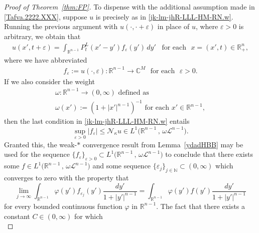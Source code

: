 \documentclass[11pt,reqno]{amsart}
\numberwithin{equation}{section}
\theoremstyle{remark}
\begin{document}
\begin{proof}[Proof of Theorem~\ref{thm:FP}]
To dispense with the additional assumption made in \eqref{Tafva.2222.XXX}, suppose $u$ is precisely as in \eqref{jk-lm-jhR-LLL-HM-RN.w}. 
Running the previous argument with $u(\cdot,\cdot+\varepsilon)$ in place of $u$, where $\varepsilon>0$ is arbitrary, 
we obtain that 
%
\begin{align}\label{AA-lm-jLL-HM-RN.ppp.wsa}
u(x',t+\varepsilon)=\int_{{\mathbb{R}}^{n-1}}P^L_t(x'-y')f_\varepsilon(y')\,dy'
\,\,\,\text{ for each }\,\,x=(x',t)\in{\mathbb{R}}^n_{+},
\end{align}
%
where we have abbreviated
%
\begin{align}\label{AA-lm-jLL-HM-RN.ppp.wsa.f}
f_\varepsilon:=u(\cdot,\varepsilon):{\mathbb{R}}^{n-1}\longrightarrow{\mathbb{C}}^M
\,\,\text{ for each }\,\,\varepsilon>0.
\end{align}
%
If we also consider the weight 
%
\begin{equation}\label{eq:16t44.iii.D+M}
\begin{array}{c}
\text{$\omega:{\mathbb{R}}^{n-1}\to(0,\infty)$ defined as} 
\\[4pt]
\text{$\omega(x'):=(1+|x'|^{n-1})^{-1}$ for each $x'\in{\mathbb{R}}^{n-1}$}, 
\end{array}
\end{equation}
%
then the last condition in \eqref{jk-lm-jhR-LLL-HM-RN.w} entails  
%
\begin{equation}\label{eq:16t44.iii}
\sup_{\varepsilon>0}|f_\varepsilon|\leq{\mathcal{N}}_{\kappa} u\in 
L^1\big({\mathbb{R}}^{n-1}\,,\,\omega{\mathscr{L}}^{n-1}\big). 
\end{equation}
%
Granted this, the weak-$\ast$ convergence result from Lemma~\ref{ydadHBB} may be used for the 
sequence $\big\{f_\varepsilon\big\}_{\varepsilon>0}\subset L^1\big({\mathbb{R}}^{n-1}\,,\,\omega{\mathscr{L}}^{n-1}\big)$
to conclude that there exists some $f\in L^1\big({\mathbb{R}}^{n-1}\,,\,\omega{\mathscr{L}}^{n-1}\big)$ 
and some sequence $\{\varepsilon_j\}_{j\in{\mathbb{N}}}\subset(0,\infty)$ which converges to zero 
with the property that 
%
\begin{equation}\label{eq:16t44.MAD}
\lim_{j\to\infty}\int_{{\mathbb{R}}^{n-1}}\varphi(y')f_{\varepsilon_j}(y')\frac{dy'}{1+|y'|^{n-1}}
=\int_{{\mathbb{R}}^{n-1}}\varphi(y')f(y')\frac{dy'}{1+|y'|^{n-1}}
\end{equation}
%
for every bounded continuous function $\varphi$ in ${\mathbb{R}}^{n-1}$.
The fact that there exists a constant $C\in(0,\infty)$ for which  
%
\begin{equation}\label{eq:16t44.iagG}

\end{equation}
\end{proof}
\end{document}
